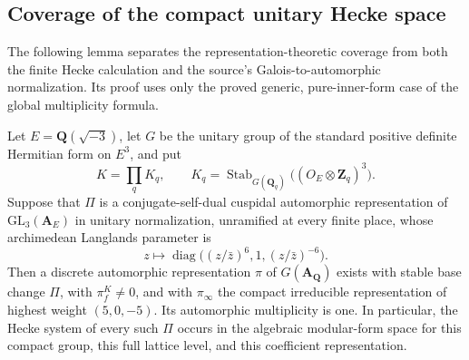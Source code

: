 \subsection{Coverage of the compact unitary Hecke space}
\label{sec:u3-coverage}

The following lemma separates the representation-theoretic coverage from
both the finite Hecke calculation and the source's Galois-to-automorphic
normalization. Its proof uses only the proved generic, pure-inner-form case
of the global multiplicity formula.

\begin{theorem}[K17-U3-COVERAGE]\label{thm:u3-coverage}
Let $E=\mathbf Q(\sqrt{-3})$, let $G$ be the unitary group of the standard
positive definite Hermitian form on $E^3$, and put
\[
 K=\prod_q K_q,\qquad
 K_q=\operatorname{Stab}_{G(\mathbf Q_q)}
       \bigl((O_E\otimes\mathbf Z_q)^3\bigr).
\]
Suppose that $\Pi$ is a conjugate-self-dual cuspidal automorphic
representation of $\mathrm{GL}_3(\mathbf A_E)$ in unitary normalization,
unramified at every finite place, whose archimedean Langlands parameter is
\[
 z\longmapsto
 \operatorname{diag}\bigl((z/\bar z)^6,1,(z/\bar z)^{-6}\bigr).
\]
Then a discrete automorphic representation $\pi$ of $G(\mathbf A_\mathbf Q)$
exists with stable base change $\Pi$, with $\pi_f^K\ne0$, and with
$\pi_\infty$ the compact irreducible representation of highest weight
$(5,0,-5)$. Its automorphic multiplicity is one. In particular, the Hecke
system of every such $\Pi$ occurs in the algebraic modular-form space for
this compact group, this full lattice level, and this coefficient
representation.
\end{theorem}

